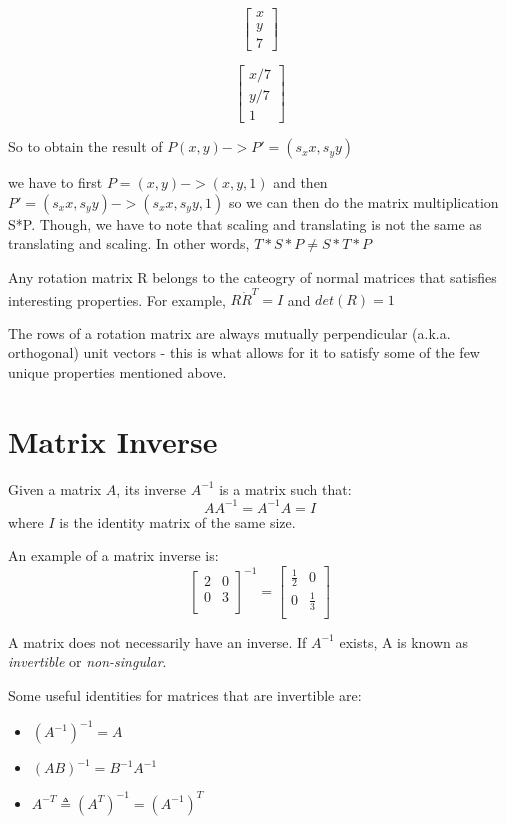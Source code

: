 \documentclass{article}
\begin{document}
\[
  \begin{bmatrix}
    x \\
    y \\ 
    7
  \end{bmatrix}
\]

\[
    \begin{bmatrix}
    x/7 \\
    y/7 \\ 
    1
  \end{bmatrix}
  \]

So to obtain the result of 
$P(x,y) -> P' = (s_x x, s_y y)$

we have to first $P = (x, y) -> (x,y,1)$ and then $P' = (s_x x, s_y y) -> (s_x x, s_y y, 1)$ so we can then do the matrix multiplication S*P. Though, we have  to note that scaling and translating is not the same as translating and scaling. In other words, $T*S*P \neq S*T*P$

Any rotation matrix R belongs to the cateogry of normal matrices that satisfies interesting properties. For example, $R \dot R^T = I$ and $det(R) = 1$

The rows of a rotation matrix are always mutually perpendicular (a.k.a. orthogonal) unit vectors - this is what allows for it to satisfy some of the few unique properties mentioned above. 

\section{Matrix Inverse}
Given a matrix $A$, its inverse $A^{-1}$ is a matrix such that:
$$AA^{-1} = A^{-1}A = I$$
where $I$ is the identity matrix of the same size.

An example of a matrix inverse is:
$$
  \begin{bmatrix}
    2 & 0 \\
    0 & 3 \\ 
  \end{bmatrix}^{-1}
  =
  \begin{bmatrix}
    \frac{1}{2} & 0 \\
    0 & \frac{1}{3} \\ 
  \end{bmatrix}
$$

A matrix does not necessarily have an inverse. If $A^{-1}$ exists, A is known as \textit{invertible} or \textit{non-singular}. 

Some useful identities for matrices that are invertible are:
\begin{itemize}
\item $(A^{-1})^{-1} = A$
\item $(AB)^{-1} = B^{-1}A^{-1}$
\item $A^{-T} \triangleq (A^T)^{-1} = (A^{-1})^T$
\end{itemize}
\end{document}
